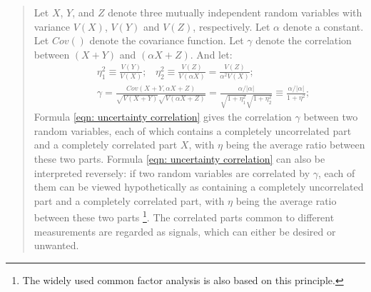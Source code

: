 \documentclass[twoside]{article}
\numberwithin{equation}{section}
\newcommand{\eqspace}{\;\;\;}
\newcommand{\Verbose}{}
\begin{document}
\ifdefined\Verbose
\begin{quotation}

Let $X$, $Y$, and $Z$ denote three mutually independent random variables \cite{Probability_Statistics} with variance $V(X)$, $V(Y)$ and $V(Z)$, respectively.  
Let $\alpha$ denote a constant.  
Let $Cov()$ denote the covariance function.  
Let $\gamma$ denote the correlation between $(X + Y)$ and $(\alpha X + Z)$. And let:
\begin{align}
\label{eqn: uncertainty ratio}
& \eta _{1} ^{2} \equiv \frac{V(Y)}{V(X)}; \eqspace
 \eta _{2} ^{2} \equiv \frac{V(Z)}{V(\alpha X)} =\frac{V(Z)}{\alpha ^{2} V(X)};  \\
\label{eqn: uncertainty correlation}
& \gamma =\frac{Cov(X+Y,\alpha X+Z)}{\sqrt{V(X+Y)} \sqrt{V(\alpha X+Z)}}  =\frac{\alpha /|\alpha |}{\sqrt{1+\eta _{1} ^{2} } \sqrt{1+\eta _{2} ^{2}}} \equiv \frac{\alpha /|\alpha |}{1+\eta ^{2}};
\end{align}
Formula \eqref{eqn: uncertainty correlation} gives the correlation $\gamma$ between two random variables, each of which contains a completely uncorrelated part and a completely correlated part $X$, with $\eta$ being the average ratio between these two parts.  
Formula \eqref{eqn: uncertainty correlation} can also be interpreted reversely: if two random variables are correlated by $\gamma$, each of them can be viewed hypothetically as containing a completely uncorrelated part and a completely correlated part, with $\eta$ being the average ratio between these two parts \footnote{The widely used common factor analysis is also based on this principle.}.
The correlated parts common to different measurements are regarded as signals, which can either be desired or unwanted.


\end{quotation}
\end{document}
